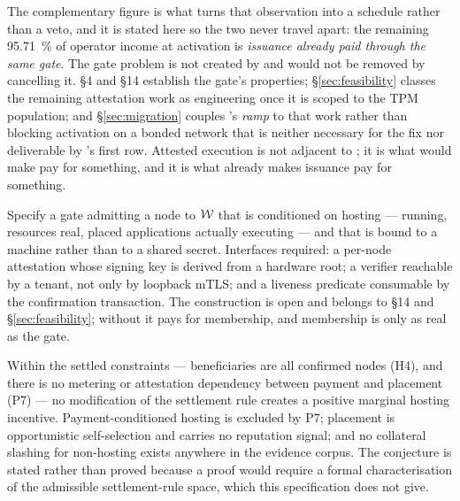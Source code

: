 \begin{remark}
The complementary figure is what turns that observation into a schedule rather than a veto, and it is
stated here so the two never travel apart: the remaining \SI{95.71}{\percent} of operator income at
activation is \emph{issuance already paid through the same gate}. The gate problem is not created by
\PNR{} and would not be removed by cancelling it. \S4 and \S14 establish the gate's properties;
\S\ref{sec:feasibility} classes the remaining attestation work as engineering once it is scoped to the
TPM population; and \S\ref{sec:migration} couples \PNR's \emph{ramp} to that work rather than blocking
activation on a bonded network that is neither necessary for the fix nor deliverable by
's first row. Attested execution is not adjacent to \PNR; it is what would
make \PNR pay for something, and it is what already makes issuance pay for something.
\end{remark}

\begin{openproblem}
\label{op:pnr:d1}
Specify a gate admitting a node to $\mathcal{W}$ that is conditioned on hosting --- \FluxOS running,
resources real, placed applications actually executing --- and that is bound to a machine rather than
to a shared secret. Interfaces required: a per-node attestation whose signing key is derived from a
hardware root; a verifier reachable by a tenant, not only by loopback mTLS; and a liveness predicate
consumable by the confirmation transaction. The construction is open and belongs to \S14 and \S\ref{sec:feasibility};
without it \PNR pays for membership, and membership is only as real as the gate.
\end{openproblem}

\begin{conjecture}
\label{conj:pnr:nohost}
Within the settled constraints --- beneficiaries are all confirmed nodes (H4), and there is no
metering or attestation dependency between payment and placement (P7) --- no modification of the
settlement rule creates a positive marginal hosting incentive. Payment-conditioned hosting is
excluded by P7; placement is opportunistic self-selection and carries no reputation signal; and no
collateral slashing for non-hosting exists anywhere in the evidence corpus. The conjecture is stated
rather than proved because a proof would require a formal characterisation of the admissible
settlement-rule space, which this specification does not give.
\end{conjecture}

